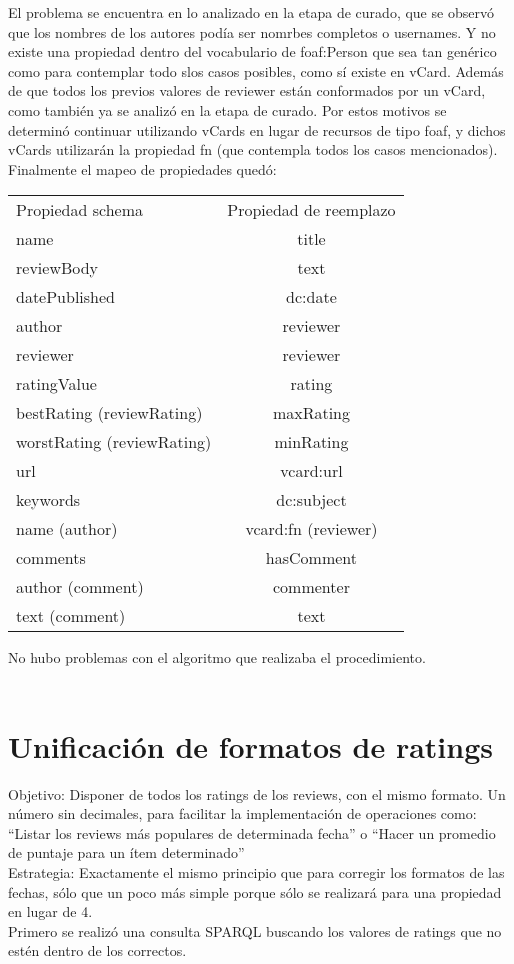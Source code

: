 El problema se encuentra en lo analizado en la etapa de curado, que se observó que los nombres de los autores podía ser nomrbes completos o usernames. 
Y no existe una propiedad dentro del vocabulario de foaf:Person que sea tan genérico como para contemplar todo slos casos posibles, como sí existe en vCard.
Además de que todos los previos valores de reviewer están conformados por un vCard, como también ya se analizó en la etapa de curado.
Por estos motivos se determinó continuar utilizando vCards en lugar de recursos de tipo foaf, y dichos vCards utilizarán la propiedad
fn (que contempla todos los casos mencionados).
Finalmente el mapeo de propiedades quedó:\\
\begin{tabular}{| l | c |}
Propiedad schema & Propiedad de reemplazo\\
name & title \\
reviewBody & text \\
datePublished & dc:date \\
author & reviewer \\
reviewer & reviewer \\
ratingValue & rating\\
bestRating (reviewRating) & maxRating\\
worstRating (reviewRating)& minRating\\
url & vcard:url\\
keywords & dc:subject\\
name (author) & vcard:fn (reviewer)\\
comments & hasComment\\
author (comment) & commenter \\
text (comment) & text 
\end{tabular}

No hubo problemas con el algoritmo que realizaba el procedimiento.
\\
\\
\section{Unificación de formatos de ratings}
\label{section:unificacion-ratings}

Objetivo: Disponer de todos los ratings de los reviews, con el mismo formato. Un número sin decimales, para facilitar la implementación 
de operaciones como: ``Listar los reviews más populares de determinada fecha'' o ``Hacer un promedio de puntaje para un ítem determinado''
\\
Estrategia: Exactamente el mismo principio que para corregir los formatos de las fechas, sólo que un poco más simple porque sólo se realizará 
para una propiedad en lugar de 4.
\\
Primero se realizó una consulta SPARQL buscando los valores de ratings que no estén dentro de los correctos. \\

